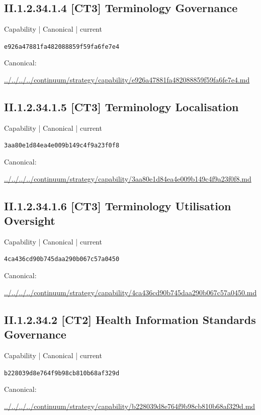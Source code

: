 \documentclass[10pt,a4paper]{article}
\begin{document}
\subsection*{II.1.2.34.1.4 [CT3] Terminology Governance}
{\small Capability | Canonical | current}\par
\texttt{e926a47881fa482088859f59fa6fe7e4}\par
Canonical: \par
{\footnotesize\url{../../../../continuum/strategy/capability/e926a47881fa482088859f59fa6fe7e4.md}}\par
\subsection*{II.1.2.34.1.5 [CT3] Terminology Localisation}
{\small Capability | Canonical | current}\par
\texttt{3aa80e1d84ea4e009b149c4f9a23f0f8}\par
Canonical: \par
{\footnotesize\url{../../../../continuum/strategy/capability/3aa80e1d84ea4e009b149c4f9a23f0f8.md}}\par
\subsection*{II.1.2.34.1.6 [CT3] Terminology Utilisation Oversight}
{\small Capability | Canonical | current}\par
\texttt{4ca436cd90b745daa290b067c57a0450}\par
Canonical: \par
{\footnotesize\url{../../../../continuum/strategy/capability/4ca436cd90b745daa290b067c57a0450.md}}\par
\subsection*{II.1.2.34.2 [CT2] Health Information Standards Governance}
{\small Capability | Canonical | current}\par
\texttt{b228039d8e764f9b98cb810b68af329d}\par
Canonical: \par
{\footnotesize\url{../../../../continuum/strategy/capability/b228039d8e764f9b98cb810b68af329d.md}}\par
\end{document}
